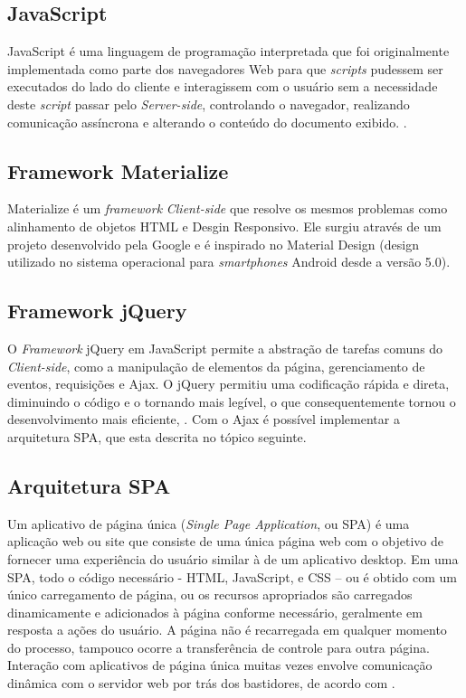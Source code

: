 \subsection{JavaScript}

JavaScript é uma linguagem de programação interpretada que foi originalmente implementada como parte dos navegadores Web para que \textit{scripts} pudessem ser executados do lado do cliente e interagissem com o usuário sem a necessidade deste \textit{script} passar pelo \textit{Server-side}, controlando o navegador, realizando comunicação assíncrona e alterando o conteúdo do documento exibido. \cite{flanagan2007javascript-UPPERCASE}.

\subsection{Framework Materialize}

Materialize é um \textit{framework} \textit{Client-side} que resolve os mesmos problemas como alinhamento de objetos HTML e Desgin Responsivo. Ele surgiu através de um projeto desenvolvido pela Google e é inspirado no Material Design (design utilizado no sistema operacional para \textit{smartphones} Android desde a versão 5.0).

\subsection{Framework {j}Query}

O \textit{Framework} jQuery em JavaScript permite a abstração de tarefas comuns do \textit{Client-side}, como a manipulação de elementos da página, gerenciamento de eventos, requisições e Ajax. O jQuery permitiu uma codificação rápida e direta, diminuindo o código e o tornando mais legível, o que consequentemente tornou o desenvolvimento mais eficiente, \cite{duckett2018javascript}. Com o Ajax é possível implementar a arquitetura SPA, que esta descrita no tópico seguinte.

\subsection{Arquitetura SPA}

Um aplicativo de página única (\textit{Single Page Application}, ou SPA) é uma aplicação web ou site que consiste de uma única página web com o objetivo de fornecer uma experiência do usuário similar à de um aplicativo desktop. Em uma SPA, todo o código necessário - HTML, JavaScript, e CSS – ou é obtido com um único carregamento de página, ou os recursos apropriados são carregados dinamicamente e adicionados à página conforme necessário, geralmente em resposta a ações do usuário. A página não é recarregada em qualquer momento do processo, tampouco ocorre a transferência de controle para outra página. Interação com aplicativos de página única muitas vezes envolve comunicação dinâmica com o servidor web por trás dos bastidores, de acordo com .

